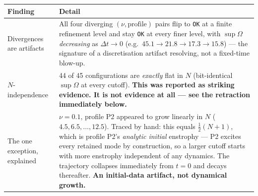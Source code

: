 \documentclass[11pt,a4paper]{article}
\theoremstyle{definition}
\theoremstyle{plain}
\begin{document}
\begin{center}
\begin{tabular}{@{}lp{11.6cm}@{}}
\toprule
\textbf{Finding} & \textbf{Detail} \\
\midrule
Divergences are artifacts & All four diverging $(\nu,\text{profile})$ pairs flip to \texttt{OK} at a finite refinement level and stay \texttt{OK} at every finer level, with $\sup\Omega$ \emph{decreasing} as $\Delta t\to0$ (e.g.\ $45.1\to21.8\to17.3\to15.8$) --- the signature of a discretisation artifact resolving, not a fixed-time blow-up. \\
\addlinespace
$N$-independence & 44 of 45 configurations are \emph{exactly} flat in $N$ (bit-identical $\sup\Omega$ at every cutoff). \textbf{This was reported as striking evidence. It is not evidence at all --- see the retraction immediately below.} \\
\addlinespace
The one exception, explained & $\nu=0.1$, profile P2 appeared to grow linearly in $N$ ($4.5,6.5,\dots,12.5$). Traced by hand: this equals $\tfrac12(N+1)$, which is profile P2's \emph{analytic initial} enstrophy --- P2 excites every retained mode by construction, so a larger cutoff starts with more enstrophy independent of any dynamics. The trajectory collapses immediately from $t=0$ and decays thereafter. \textbf{An initial-data artifact, not dynamical growth.} \\
\bottomrule
\end{tabular}
\end{center}
\end{document}
